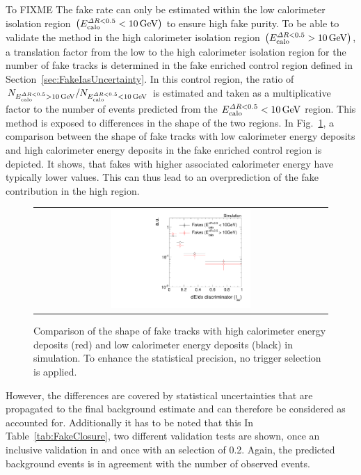 To FIXME
The fake rate can only be estimated within the low calorimeter isolation region $\left(E^{\Delta R<0.5}_{\text{calo}}<10\,\text{Ge}\kern-0.06667em\text{V}\right)$ to ensure high fake purity.
To be able to validate the method in the high calorimeter isolation region $\left(E^{\Delta R<0.5}_{\text{calo}}>10\,\text{Ge}\kern-0.06667em\text{V}\right)$, a translation factor from the low to the high calorimeter isolation region for the number of fake tracks is determined in the fake enriched control region \fakeCR defined in Section~\ref{sec:FakeIasUncertainty}.
In this control region, the ratio of $N_{E^{\Delta R<0.5}_{\text{calo}}>10\,\text{Ge}\kern-0.06667em\text{V}}/N_{E^{\Delta R<0.5}_{\text{calo}}<10\,\text{Ge}\kern-0.06667em\text{V}}$ is estimated and taken as a multiplicative factor to the number of events predicted from the $E^{\Delta R<0.5}_{\text{calo}}<10\,\text{Ge}\kern-0.06667em\text{V}$ region.
This method is exposed to differences in the \ias shape of the two \ecalo regions.
In Fig.~\ref{fig:IasValidate}, a comparison between the \ias shape of fake tracks with low calorimeter energy deposits and high calorimeter energy deposits in the fake enriched control region is depicted.
It shows, that fakes with higher associated calorimeter energy have typically lower \ias values. This can thus lead to an overprediction of the fake contribution in the high \ecalo region.
\begin{figure}[!h]
  \centering 
  \begin{tabular}{c}
    \includegraphics[width=0.49\textwidth]{figures/analysis_2/Background/IasForFakes_chiTrackspreselectionNoTrigger.pdf}
  \end{tabular}
  \caption{Comparison of the \ias shape of fake tracks with high calorimeter energy deposits (red) and low calorimeter energy deposits (black) in simulation.
           To enhance the statistical precision, no trigger selection is applied.}
  \label{fig:IasValidate}
\end{figure}
However, the differences are covered by statistical uncertainties that are propagated to the final background estimate and can therefore be considered as accounted for.
Additionally it has to be noted that this
In Table~\ref{tab:FakeClosure}, two different validation tests are shown, once an inclusive validation in \ias and once with an \ias selection of 0.2.
Again, the predicted background events is in agreement with the number of observed events.


